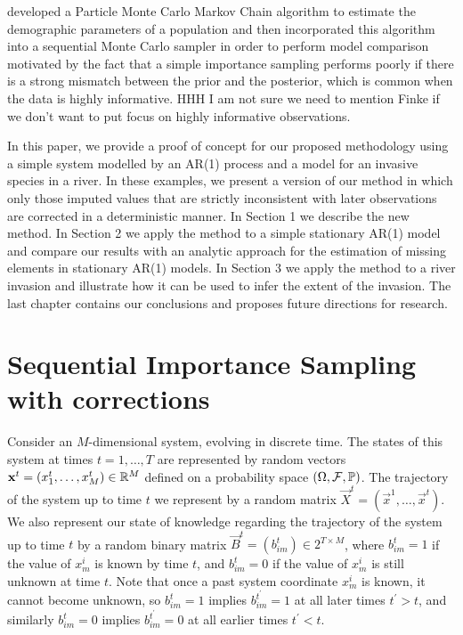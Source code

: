\cite{Finke} developed a Particle Monte Carlo Markov Chain algorithm to estimate the demographic parameters of a population and then incorporated this algorithm into a sequential Monte Carlo sampler in order to perform model comparison motivated by the fact that a simple importance sampling performs poorly if there is a strong mismatch between the prior and the posterior, which is common when the data is highly informative. {\color{blue}HHH I am not sure we need to mention Finke if we don't want to put focus on highly informative observations.}

In this paper, we provide a proof of concept for our proposed methodology using a simple system modelled by an AR(1) process and a model for an invasive species in a river. In these examples, we present a version of our method in which only those imputed values that are strictly inconsistent with later observations are corrected in a deterministic manner. 
In Section 1 we describe the new method. In Section 2 we apply the method to a simple stationary AR(1) model and compare our results with an analytic approach for the estimation of missing elements in stationary AR(1) models.
In Section 3 we apply the method to a river invasion and illustrate how it can be used to infer the extent of the invasion.
The last chapter contains our conclusions and proposes future directions for research.

\section{Sequential Importance Sampling with corrections}
\label{sec:2}

Consider an $M$-dimensional system, evolving in discrete time. The states of this system at times $t = 1, \dots, T$ are represented by random vectors $\mathbf{x}^t = (x^t_1, \dots, x^t_M) \in \mathbb R^M$ defined on a probability space $(\Omega, \mathcal{F}, \mathbb{P})$. The trajectory of the system up to time $t$ we represent by a random matrix $\vec{X}^t = (\vec{x}^1, \ldots, \vec{x}^t)$. We also represent our state of knowledge regarding the trajectory of the system up to time $t$ by a random binary matrix $\vec{B}^t = (b^t_{im}) \in 2^{T \times M}$, where $b^t_{im} = 1$ if the value of $x^i_m$ is known by time $t$, and $b^t_{im} = 0$ if the value of $x^i_m$ is still unknown at time $t$. Note that once a past system coordinate $x^i_m$ is known, it cannot become unknown, so $b^t_{im} = 1$ implies $b^{t^\prime}_{im} = 1$ at all later times $t^{\prime} > t$, and similarly $b^t_{im} = 0$ implies $b^{t^{\prime}}_{im} = 0$ at all earlier times $t^{\prime} < t$.

